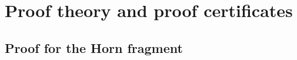 \section{Proof theory and proof certificates}
\label{sec:three}


\subsection{Proof for the Horn fragment}
\label{ssec:focused}




